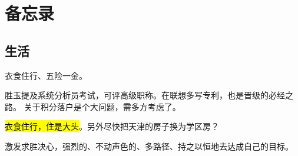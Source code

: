 \chapter{备忘录}

\section{生活}

衣食住行、五险一金。

胜玉提及系统分析员考试，可评高级职称。在联想多写专利，也是晋级的必经之路。
关于积分落户是个大问题，需多方考虑了。

\hl{衣食住行，住是大头}。另外尽快把天津的房子换为学区房？

激发求胜决心，强烈的、不动声色的、多路径、持之以恒地去达成自己的目标。

